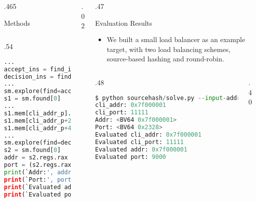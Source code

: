 \documentclass[final,hyperref={pdfpagelabels=false}]{beamer}
\begin{document}
\begin{frame}[t,fragile]
\begin{columns}[t]
\begin{column}{.465\textwidth}
\begin{block}{Methods}
\begin{columns}
\begin{column}{.54\textwidth}
\begin{lstlisting}[language=python,basicstyle=\footnotesize\ttfamily]
...
accept_ins = find_ins(call_accept)
decision_ins = find_ins(call_select_server)
...
sm.explore(find=accept_ins)
s1 = sm.found[0]
...
s1.mem[cli_addr_p].short      = 2
s1.mem[cli_addr_p+2].uint16_t = 12345
s1.mem[cli_addr_p+4].uint32_t = 0x7f000001
...
sm.explore(find=decision_ins)
s2 = sm.found[0]
addr = s2.regs.rax & 0xffffffff
port = (s2.regs.rax & 0xffffffff00000000) >> 32
print(`Addr:', addr)
print(`Port:', port)
print(`Evaluated addr:', s2.solver.eval(addr))
print(`Evaluated port:', s2.solver.eval(port))
\end{lstlisting}
\end{column}

\end{columns}
\end{block}


\end{column} %

\begin{column}{.02\textwidth}\end{column} %

\begin{column}{.47\textwidth} %


\begin{block}{Evaluation Results}

\begin{itemize}
    \item We built a small load balancer as an example target, with two load
        balancing schemes, source-based hashing and round-robin.
\end{itemize}

\begin{columns}
\begin{column}{.48\textwidth}
\begin{lstlisting}[language=python,basicstyle=\footnotesize\ttfamily]
$ python sourcehash/solve.py --input-addr 0x7f000001 --input-port 11111
cli_addr: 0x7f000001
cli_port: 11111
Addr: <BV64 0x7f000001>
Port: <BV64 0x2328>
Evaluated cli_addr: 0x7f000001
Evaluated cli_port: 11111
Evaluated addr: 0x7f000001
Evaluated port: 9000
\end{lstlisting}
\end{column}
\begin{column}{.40\textwidth}
\end{column}
\end{columns}


\end{block}
\end{column}
\end{columns}
\end{frame}
\end{document}
